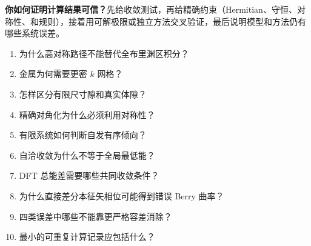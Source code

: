 \begin{interviewbox}
\textbf{你如何证明计算结果可信？}先给收敛测试，再给精确约束（Hermitian、守恒、对称性、和规则），接着用可解极限或独立方法交叉验证，最后说明模型和方法仍有哪些系统误差。
\end{interviewbox}
\begin{selftestbox}
\begin{enumerate}
\item 为什么高对称路径不能替代全布里渊区积分？
\item 金属为何需要更密 $k$ 网格？
\item 怎样区分有限尺寸隙和真实体隙？
\item 精确对角化为什么必须利用对称性？
\item 有限系统如何判断自发有序倾向？
\item 自洽收敛为什么不等于全局最低能？
\item DFT 总能差需要哪些共同收敛条件？
\item 为什么直接差分本征矢相位可能得到错误 Berry 曲率？
\item 四类误差中哪些不能靠更严格容差消除？
\item 最小的可重复计算记录应包括什么？
\end{enumerate}
\end{selftestbox}
